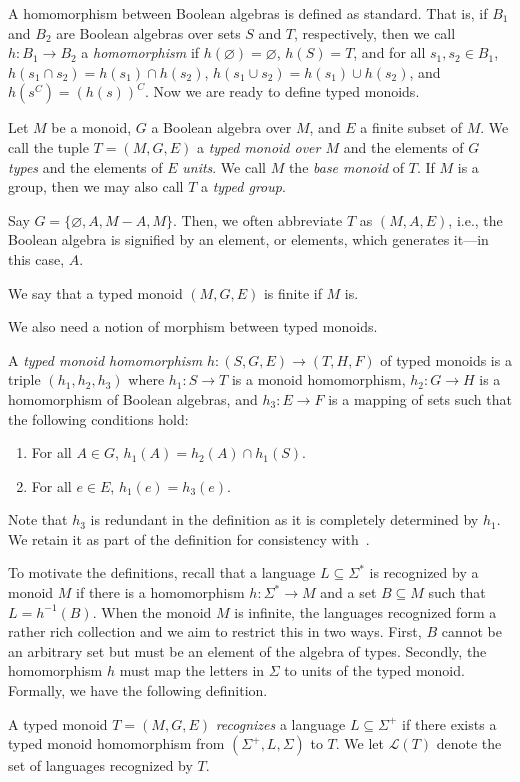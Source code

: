 \documentclass[a4paper,UKenglish,cleveref, autoref, thm-restate, anonymous]{lipics-v2021}
\begin{document}
A homomorphism between Boolean algebras is defined as standard.  That is, if $B_1$ and $B_2$ are Boolean algebras over sets $S$ and $T$, respectively, then we call $h : B_1 \rightarrow B_2$ a \emph{homomorphism} if $h(\varnothing) = \varnothing$, $h(S) = T$, and for all $s_1, s_2 \in B_1$, $h(s_1 \cap s_2) = h(s_1) \cap h(s_2)$, $h(s_1 \cup s_2) = h(s_1) \cup h(s_2)$, and $h(s^C) = (h(s))^C$.
Now we are ready to define typed monoids.

\begin{definition}
    Let $M$ be a monoid, $G$ a Boolean algebra over $M$, and $E$ a finite subset of $M$. We call the tuple $T = (M, G, E)$ a \emph{typed monoid over $M$} and the elements of $G$ \emph{types} and the elements of $E$ \emph{units}. We call $M$ the \emph{base monoid} of $T$. If $M$ is a group, then we may also call $T$ a \emph{typed group}.

    Say $G = \{\varnothing, A, M - A, M\}$. Then, we often abbreviate $T$ as $(M, A, E)$, i.e., the Boolean algebra is signified by an element, or elements, which generates it---in this case, $A$. 
\end{definition}
We say that a typed monoid $(M,G,E)$ is finite if $M$ is.

We also need a notion of morphism between typed monoids.
\begin{definition}\label{def:typedhom}
    A \emph{typed monoid homomorphism} $h : (S, G, E) \rightarrow (T, H, F)$ of typed monoids is a triple $(h_1, h_2, h_3)$ where $h_1 : S \rightarrow T$ is a monoid homomorphism, $h_2 : G \rightarrow H$ is a homomorphism of Boolean algebras, and $h_3 : E \rightarrow F$ is a mapping of sets such that the following conditions hold:
    \begin{enumerate}[\ \ \ \ (i)]
        \item For all $A \in G$, $h_1(A) = h_2(A) \cap h_1(S)$.
        \item For all $e \in E$, $h_1(e) = h_3(e)$.
    \end{enumerate}
\end{definition}
Note that $h_3$ is redundant in the definition as it is completely determined by $h_1$.  We retain it as part of the definition for consistency with~\cite{behle2011typed,krebs2008typed}.

To motivate the definitions, recall that a language $L \subseteq \Sigma^*$ is recognized by a monoid $M$ if there is a homomorphism $h: \Sigma^* \rightarrow M$ and a set $B \subseteq M$ such that $L = h^{-1}(B)$.  When the monoid $M$ is infinite, the languages recognized form a rather rich collection and we aim to restrict this in two ways.  First, $B$ cannot be an arbitrary set but must be an element of the algebra of types.  Secondly, the homomorphism $h$ must map the letters in $\Sigma$ to units of the typed monoid.  Formally, we have the following definition.
\begin{definition}\label{def:langrecognitiontyped}
    A typed monoid $T = (M, G, E)$ \emph{recognizes} a language $L \subseteq \Sigma^+$ if there exists a typed monoid homomorphism from $(\Sigma^+, L, \Sigma)$ to $T$. We let $\mathcal{L}(T)$ denote the set of languages recognized by $T$.
\end{definition}
\end{document}
